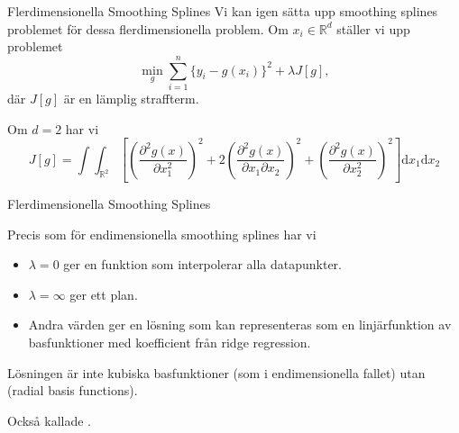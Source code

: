 \documentclass[10pt,english]{beamer}
\begin{document}
\begin{frame}{Flerdimensionella Smoothing Splines}
    Vi kan igen sätta upp smoothing splines problemet för dessa flerdimensionella problem. Om $x_i \in \mathbb{R}^d$ ställer vi upp problemet
    \begin{equation*}
        \min_g \sum_{i=1}^{n}\{y_i - g(x_i)\}^2 + \lambda J[g],
    \end{equation*}
    där $J[g]$ är en lämplig straffterm.

    Om $d=2$ har vi
    \begin{equation*}
        J[g] = \int \int_{\mathbb{R}^2} \left[ \left( \frac{\partial^2 g(x)}{\partial x_1^2}\right)^2 + 2 \left(\frac{\partial^2 g(x)}{\partial x_1 \partial x_2}\right)^2 + \left(\frac{\partial^2 g(x)}{\partial x_2^2}\right)^2  \right] \mathrm{d}x_1 \mathrm{d} x_2
    \end{equation*}
\end{frame}

\begin{frame}{Flerdimensionella Smoothing Splines}

    Precis som för endimensionella smoothing splines har vi
    \begin{itemize}
        \item $\lambda = 0$ ger en funktion som interpolerar alla datapunkter.
        \item $\lambda = \infty$ ger ett plan.
        \item Andra värden ger en lösning som kan representeras som en linjärfunktion av basfunktioner med koefficient från ridge regression.
    \end{itemize}

    Lösningen är inte kubiska basfunktioner (som i endimensionella fallet) utan  (radial basis functions).

    Också kallade .
    
\end{frame}
\end{document}
